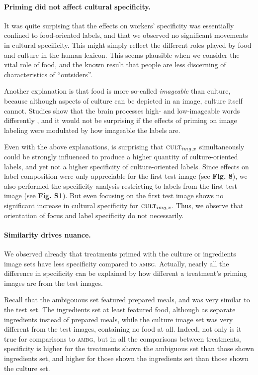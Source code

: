 \documentclass[a4paper]{report}
\begin{document}
\paragraph{Priming did not affect cultural specificity.}
It was quite surpising that the effects on workers' specificity was essentially
confined to food-oriented labels, and that we observed no significant movements
in cultural specificity.   This might simply reflect the different roles
played by food and culture in the human lexicon.  This seems plausible when we 
consider the vital role of food, and the known result that people are less
discerning of characteristics of ``outsiders''.

Another explanation is that food is more so-called \textit{imageable} than 
culture, because although aspects of culture can be depicted in an image,
culture itself cannot.  Studies show that the brain processes high- and 
low-imageable words differently \cite{Swaab200299}, and it would not be 
surprising if the effects of priming on image labeling were modulated by how 
imageable the labels are.

Even with the above explanations, is surprising that 
$\textsc{cult}_{img,x}$ simultaneously could be strongly influenced to 
produce a higher quantity of culture-oriented labels, and yet not a higher
specificity of culture-oriented labels.  Since effects on 
label composition were only appreciable for the first test image 
(see \textbf{Fig. 8}), we also
performed the specificity analysis restricting to labels from the first
test image (see \textbf{Fig. S1}).  But even focusing on the first test image
shows no significant increase in cultural specificity for 
$\textsc{cult}_{img,x}$.  Thus, we observe that orientation of focus and 
label specificity do not necessarily.


\paragraph{Similarity drives nuance.}
We observed already that treatments primed with the 
culture or ingredients image sets have less specificity compared to 
\textsc{ambg}.  Actually, nearly all the difference in specificity
can be explained by how different a treatment's priming images are from the 
test images.  

Recall that the ambigouous set featured prepared meals, and 
was very similar to the test set.  The ingredients set at least featured 
food, although as separate ingredients instead of prepared meals, while the
culture image set was very different from the test images, containing no food
at all.
Indeed, not only is it true for comparisons to \textsc{ambg}, but in all the 
comparisons between treatments, specificity is higher for the 
treatments shown the ambiguous set than those shown ingredients set, 
and higher for those shown the ingredients set than those shown the culture 
set.
\end{document}
